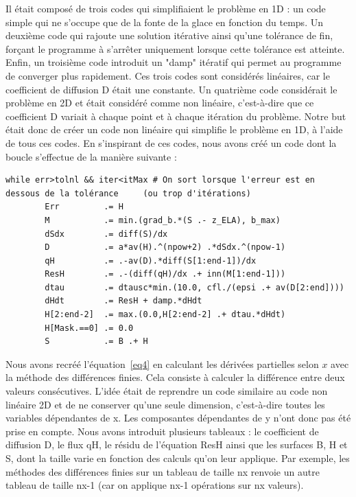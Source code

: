 \documentclass{article}
\begin{document}
 Il était composé de trois codes qui simplifiaient le problème en 1D : un code simple qui ne s'occupe que de la fonte de la glace en fonction du temps. Un deuxième code qui rajoute une solution itérative ainsi qu'une tolérance de fin, forçant le programme à s'arrêter uniquement lorsque cette tolérance est atteinte. Enfin, un troisième code introduit un "damp" itératif qui permet au programme de converger plus rapidement.
\newline
Ces trois codes sont considérés linéaires, car le coefficient de diffusion D était une constante.
\newline
Un quatrième code considérait le problème en 2D et était considéré comme non linéaire, c'est-à-dire que ce coefficient D variait à chaque point et à chaque itération du problème. Notre but était donc de créer un code non linéaire qui simplifie le problème en 1D, à l'aide de tous ces codes.
\newline
En s'inspirant de ces codes, nous avons créé un code dont la boucle s'effectue de la manière suivante :
\newline
\begin{verbatim}
while err>tolnl && iter<itMax # On sort lorsque l'erreur est en 
dessous de la tolérance 	(ou trop d'itérations)
        Err         .= H                                               
        M           .= min.(grad_b.*(S .- z_ELA), b_max)            
        dSdx        .= diff(S)/dx 
        D           .= a*av(H).^(npow+2) .*dSdx.^(npow-1)              
        qH          .= .-av(D).*diff(S[1:end-1])/dx                     
        ResH        .= .-(diff(qH)/dx .+ inn(M[1:end-1])) 
        dtau        .= dtausc*min.(10.0, cfl./(epsi .+ av(D[2:end])))
        dHdt        .= ResH + damp.*dHdt                                
        H[2:end-2]  .= max.(0.0,H[2:end-2] .+ dtau.*dHdt)               
        H[Mask.==0] .= 0.0
        S           .= B .+ H                                       
\end{verbatim}
\newpage
Nous avons recréé l'équation~\eqref{eq4} en calculant les dérivées partielles selon ${x}$ avec la méthode des différences finies. Cela consiste à calculer la différence entre deux valeurs consécutives. L'idée était de reprendre un code similaire au code non linéaire 2D et de ne conserver qu'une seule dimension, c'est-à-dire toutes les variables dépendantes de x. Les composantes dépendantes de y n'ont donc pas été prise en compte.
\newline
Nous avons introduit plusieurs tableaux : le coefficient de diffusion D, le flux qH, le résidu de l'équation ResH ainsi que les surfaces B, H et S, dont la taille varie en fonction des calculs qu'on leur applique. Par exemple, les méthodes des différences finies sur un tableau de taille nx renvoie un autre tableau de taille nx-1 (car on applique nx-1 opérations sur nx valeurs).
\end{document}
